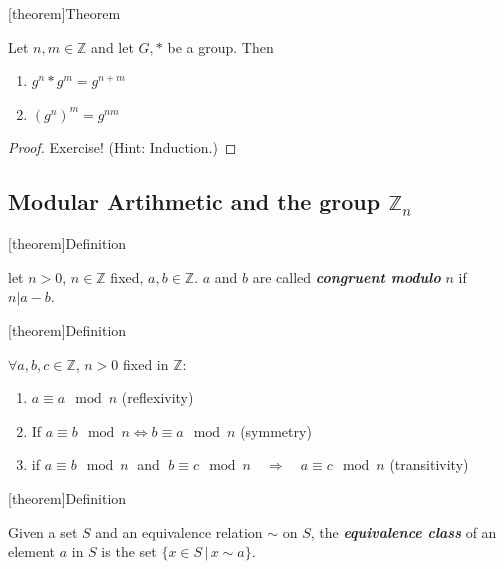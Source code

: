 \documentclass[12pt]{report}
\theoremstyle{definition}
\begin{document}
[theorem]{Theorem}
\begin{properties of g tp n}
    Let $n, m \in \mathbb{Z}$ and let $G, *$ be a group. Then
    \begin{enumerate}
        \item $g^{n} * g^{m} = g^{n + m}$
        \item ${(g^{n})}^{m} = g^{nm}$
    \end{enumerate}
    
\end{properties of g tp n}

\begin{proof}
    Exercise! (Hint: Induction.)
\end{proof}

\subsection{Modular Artihmetic and the group $\mathbb{Z}_n$}

[theorem]{Definition}
\begin{congruent modulo n}
    let $n > 0$, $n \in \mathbb{Z}$ fixed, $a,b \in \mathbb{Z}$. 
    $a$ and $b$ are called \textbf{\emph{congruent modulo}} $n$ if $n | a - b$.
\end{congruent modulo n}

[theorem]{Definition}
\begin{modular arithmetic}
    $\forall a, b, c \in \mathbb{Z}$, $n > 0$ fixed in $\mathbb{Z}$:
    \begin{enumerate}[label = (\arabic*)]
        \item $a \equiv a \mod n$ (reflexivity)
        \item If $a \equiv b \mod n \iff b \equiv a \mod n$ (symmetry)
        \item if $a \equiv b \mod n \;$ and $\;b \equiv c \mod n \quad \Longrightarrow \quad  a \equiv c \mod n$ (transitivity)
    \end{enumerate}
    
\end{modular arithmetic}

[theorem]{Definition}
\begin{equivalence class}
    Given a set $S$ and an equivalence relation $\sim$ on $S$, the \textbf{\emph{equivalence class}}
    of an element $a$ in $S$ is the set $\{x \in S \,|\, x \sim a\}$.
\end{equivalence class}
\end{document}
